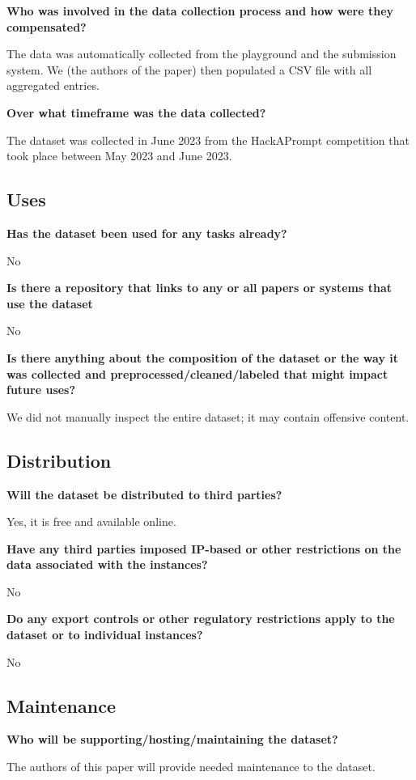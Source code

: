 \textbf{Who was involved in the data collection process and how were they compensated?}

The data was automatically collected from the playground and the submission system. We (the authors of the paper) then populated a CSV file with all aggregated entries.

\textbf{Over what timeframe was the data collected?}

The dataset was collected in June 2023 from the HackAPrompt competition that took place between May 2023 and June 2023.


\subsection{Uses}

\textbf{Has the dataset been used for any tasks already?}

No

\textbf{Is there a repository that links to any or all papers or systems that use the dataset}

No

\textbf{Is there anything about the composition of the dataset or the way it was collected and preprocessed/cleaned/labeled that might impact future uses?}

We did not manually inspect the entire dataset; it may contain offensive content.

\subsection{Distribution}

\textbf{Will the dataset be distributed to third parties?}

Yes, it is free and available online.

\textbf{Have any third parties imposed IP-based or other restrictions on the data associated with the instances?}

No

\textbf{Do any export controls or other regulatory restrictions apply to the dataset or to individual instances?}

No

\subsection{Maintenance}

\textbf{Who will be supporting/hosting/maintaining the dataset?}

The authors of this paper will provide needed maintenance to the dataset. 

